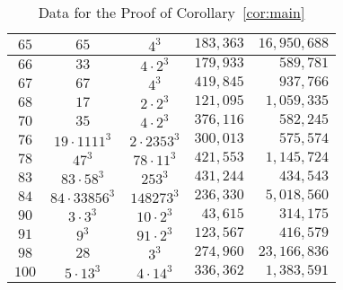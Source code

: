 \documentclass{jT}
\theoremstyle{definition}
\begin{document}
\begin{table}[ht]
\begin{center}
\begin{tabular}{||cccrr||}
$65$  & $65$                 &        $4^{3}$          & $183,363$ & $16,950,688$ \\ \hline
$66$  & $33$                 &    $4 \cdot 2^{3}$      & $179,933$ &    $589,781$ \\ \hline
$67$  & $67$                 &         $4^{3}$         & $419,845$ &    $937,766$ \\ \hline
$68$  & $17$                 &    $2 \cdot 2^{3}$      & $121,095$ &  $1,059,335$ \\ \hline
$70$  & $35$                 &    $4 \cdot 2^{3}$      & $376,116$ &    $582,245$ \\ \hline
$76$  & $19 \cdot 1111^{3}$  &    $2 \cdot 2353^{3}$   & $300,013$ &    $575,574$ \\ \hline
$78$  & $47^{3}$           & $78 \cdot 11^{3}$    & $421,553$ &  $1,145,724$ \\ \hline
$83$  & $83 \cdot 58^{3}$    &         $253^{3}$       & $431,244$ &    $434,543$ \\ \hline
$84$  & $84 \cdot 33856^{3}$ &       $148273^{3}$      & $236,330$ &  $5,018,560$ \\ \hline
$90$  & $3 \cdot 3^{3}$      &     $10 \cdot 2^{3}$    &  $43,615$ &    $314,175$ \\ \hline
$91$  & $9^{3}$              &     $91 \cdot 2^{3}$    & $123,567$ &    $416,579$ \\ \hline
$98$  & $28$                 &         $3^{3}$         & $274,960$ & $23,166,836$ \\ \hline
$100$ & $5 \cdot 13^{3}$     &     $4 \cdot 14^{3}$    & $336,362$ &  $1,383,591$ \\ \hline
\end{tabular}
\caption{Data for the Proof of Corollary~\ref{cor:main}}
\end{center}
\end{table}
\end{document}

